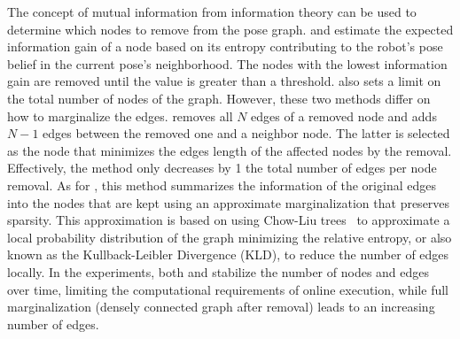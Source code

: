 The concept of mutual information from information theory can be used to determine which nodes to remove from the pose graph.
\cite{kretzschmar-et-al:2010:2} and \cite{kretzschmar-stachniss:2012:0278364912455072} estimate the expected information gain of a node based on its entropy contributing to the robot's pose belief in the current pose's neighborhood. The nodes with the lowest information gain are removed until the value is greater than a threshold. \cite{kretzschmar-stachniss:2012:0278364912455072} also sets a limit on the total number of nodes of the graph.
However, these two methods differ on how to marginalize the edges.
\cite{kretzschmar-et-al:2010:2} removes all $N$ edges of a removed node and adds $N-1$ edges between the removed one and a neighbor node. The latter is selected as the node that minimizes the edges length of the affected nodes by the removal. Effectively, the method only decreases by 1 the total number of edges per node removal.
As for \cite{kretzschmar-stachniss:2012:0278364912455072}, this method summarizes the information of the original edges into the nodes that are kept using an approximate marginalization that preserves sparsity. This approximation is based on using Chow-Liu trees~\parencite{original:chow-liu} to approximate a local probability distribution of the graph minimizing the relative entropy, or also known as the Kullback-Leibler Divergence (KLD), to reduce the number of edges locally.
In the experiments, both \cite{kretzschmar-et-al:2010:2} and \cite{kretzschmar-stachniss:2012:0278364912455072} stabilize the number of nodes and edges over time, limiting the computational requirements of online execution, while full marginalization (densely connected graph after removal) leads to an increasing number of edges.

